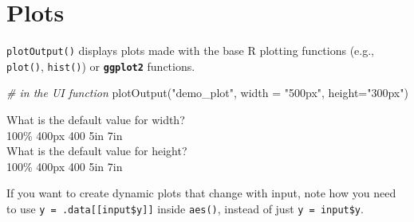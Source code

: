 \documentclass[
  oneside]{book}
\newenvironment{Shaded}{\begin{snugshade}}{\end{snugshade}}
\newcommand{\AttributeTok}[1]{\textcolor[rgb]{0.77,0.63,0.00}{#1}}
\newcommand{\CommentTok}[1]{\textcolor[rgb]{0.56,0.35,0.01}{\textit{#1}}}
\newcommand{\ConstantTok}[1]{\textcolor[rgb]{0.00,0.00,0.00}{#1}}
\newcommand{\FunctionTok}[1]{\textcolor[rgb]{0.00,0.00,0.00}{#1}}
\newcommand{\NormalTok}[1]{#1}
\newcommand{\OtherTok}[1]{\textcolor[rgb]{0.56,0.35,0.01}{#1}}
\newcommand{\SpecialCharTok}[1]{\textcolor[rgb]{0.00,0.00,0.00}{#1}}
\newcommand{\StringTok}[1]{\textcolor[rgb]{0.31,0.60,0.02}{#1}}
\begin{document}
\hypertarget{plots}{%
\section{Plots}\label{plots}}

\texttt{plotOutput}\texttt{()} displays plots made with the base R plotting functions (e.g., \texttt{plot}\texttt{()}, \texttt{hist}\texttt{()}) or \textbf{\texttt{ggplot2}} functions.

\begin{Shaded}
\begin{Highlighting}[]
\CommentTok{\# in the UI function}
\FunctionTok{plotOutput}\NormalTok{(}\StringTok{"demo\_plot"}\NormalTok{, }\AttributeTok{width =} \StringTok{"500px"}\NormalTok{, }\AttributeTok{height=}\StringTok{"300px"}\NormalTok{)}
\end{Highlighting}
\end{Shaded}

What is the default value for \AttributeTok{width}?\\
100\% 400px 400 5in 7in\\
What is the default value for \AttributeTok{height}?\\
100\% 400px 400 5in 7in

\begin{Shaded}
\end{Shaded}

\begin{warning}
If you want to create dynamic plots that change with input, note how you need to use \texttt{y\ =\ .data{[}{[}input\$y{]}{]}} inside \texttt{aes}\texttt{()}, instead of just \texttt{y\ =\ input\$y}.

\end{warning}
\end{document}
